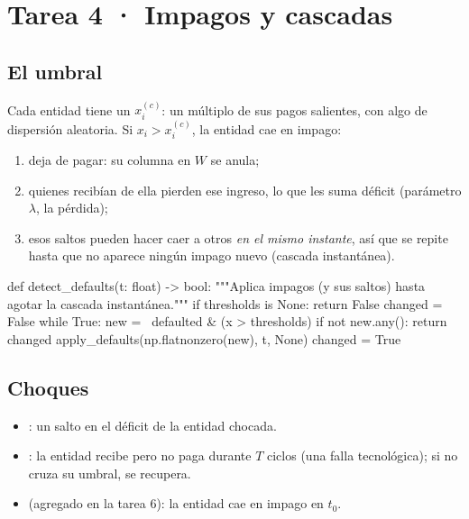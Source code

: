 \chapter{Tarea 4 · Impagos y cascadas}

\section{El umbral}
Cada entidad tiene un  $x_i^{(c)}$: un múltiplo de sus pagos salientes,
con algo de dispersión aleatoria. Si $x_i > x_i^{(c)}$, la entidad cae en impago:
\begin{enumerate}
\item deja de pagar: su columna en $W$ se anula;
\item quienes recibían de ella pierden ese ingreso, lo que les suma déficit
(parámetro $\lambda$, la pérdida);
\item esos saltos pueden hacer caer a otros \emph{en el mismo instante}, así que se
repite hasta que no aparece ningún impago nuevo (cascada instantánea).
\end{enumerate}

\begin{codigo}[label=src/pulso/integrate.py · simulate (detección de impagos)]
def detect_defaults(t: float) -> bool:
    """Aplica impagos (y sus saltos) hasta agotar la cascada instantánea."""
    if thresholds is None:
        return False
    changed = False
    while True:
        new = ~defaulted & (x > thresholds)
        if not new.any():
            return changed
        apply_defaults(np.flatnonzero(new), t, None)
        changed = True
\end{codigo}

\section{Choques}
\begin{itemize}
\item {}: un salto en el déficit de la entidad chocada.
\item {}: la entidad recibe pero no paga durante $T$ ciclos (una
falla tecnológica); si no cruza su umbral, se recupera.
\item {} (agregado en la tarea 6): la entidad cae en impago en $t_0$.
\end{itemize}

